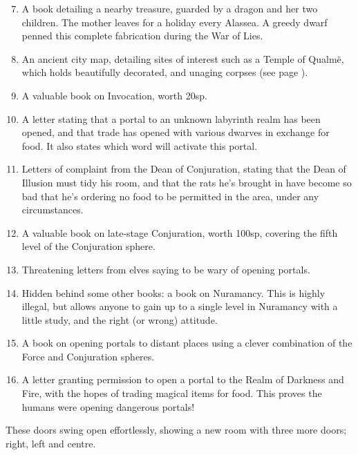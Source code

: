 \begin{multicols}{2}
\begin{enumerate}

\setcounter{enumi}{6}
  \item
  A book detailing a nearby treasure, guarded by a dragon and her two children.
  The mother leaves for a holiday every Alassea.
  A greedy dwarf penned this complete fabrication during the War of Lies.%
  \item
  An ancient city map, detailing sites of interest such as a Temple of Qualm\"{e}, which holds beautifully decorated, and unaging corpses (see page \pageref{green_tower}).
  \item
  A valuable book on Invocation, worth 20sp.
  \item
  A letter stating that a portal to an unknown labyrinth realm has been opened, and that trade has opened with various dwarves in exchange for food.  It also states which word will activate this portal.
  \item
  Letters of complaint from the Dean of Conjuration, stating that the Dean of Illusion must tidy his room, and that the rats he's brought in have become so bad that he's ordering no food to be permitted in the area, under any circumstances.
  \item
  A valuable book on late-stage Conjuration, worth 100sp, covering the fifth level of the Conjuration sphere.
  \item
  Threatening letters from elves saying to be wary of opening portals.
  \item
  Hidden behind some other books: a book on Nuramancy.  This is highly illegal, but allows anyone to gain up to a single level in Nuramancy with a little study, and the right (or wrong) attitude.
  \item
  A book on opening portals to distant places using a clever combination of the Force and Conjuration spheres.
  \item
  A letter granting permission to open a portal to the Realm of Darkness and Fire, with the hopes of trading magical items for food.
  This proves the humans were opening dangerous portals!

\end{enumerate}


\begin{boxtext}
  These doors swing open effortlessly, showing a new room with three more doors; right, left and centre.


\end{boxtext}
\end{multicols}
